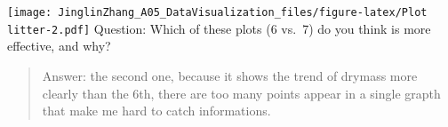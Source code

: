 \documentclass[
]{article}
\begin{document}
\texttt{[image: JinglinZhang\_A05\_DataVisualization\_files/figure-latex/Plot litter-2.pdf]}
Question: Which of these plots (6 vs.~7) do you think is more effective,
and why?

\begin{quote}
Answer: the second one, because it shows the trend of drymass more
clearly than the 6th, there are too many points appear in a single
grapth that make me hard to catch informations.
\end{quote}
\end{document}
